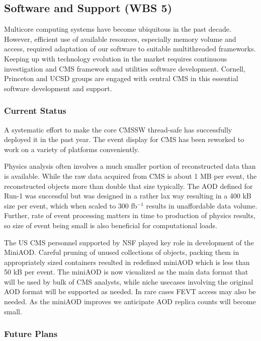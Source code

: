 \documentclass[11pt,a4paper]{article}
\begin{document}
\subsection{Software and Support (WBS 5)}

Multicore computing systems have become ubiquitous in the past
decade. However, efficient use of available resources, especially
memory volume and access, required adaptation of our software to
suitable multithreaded frameworks. Keeping up with technology
evolution in the market requires continuous investigation and CMS
framework and utilities software development.  Cornell, Princeton and
UCSD groups are engaged with central CMS in this essential software
development and support.

\subsubsection{Current Status}

A systematic effort to make the core CMSSW thread-safe has
successfully deployed it in the past year.  The event display
for CMS has been reworked to work on a variety of platforms
conveniently.


Physics analysis often involves a much smaller portion of
reconstructed data than is available. While the raw data acquired from
CMS is about 1 MB per event, the reconstructed objects more than
double that size typically. The AOD defined for Run-1 was successful
but was designed in a rather lax way resulting in a 400 kB size per
event, which when scaled to 300 fb$^{-1}$ results in unaffordable
data volume. Further, rate of event processing matters in time to
production of physics results, so size of event being small is also
beneficial for computational loads. 

The US CMS personnel supported by NSF played key role in development
of the MiniAOD.  Careful pruning of unused collections of objects, packing them
in appropriately sized containers resulted in redefined miniAOD which
is less than 50 kB per event. The miniAOD is now visualized as the main data format that will
be used by bulk of CMS analysts, while niche usecases involving the
original AOD format will be supported as needed. In rare cases FEVT
access may also be needed.  As the miniAOD improves we anticipate AOD
replica counts will become small. 

\subsubsection{Future Plans}
\end{document}

